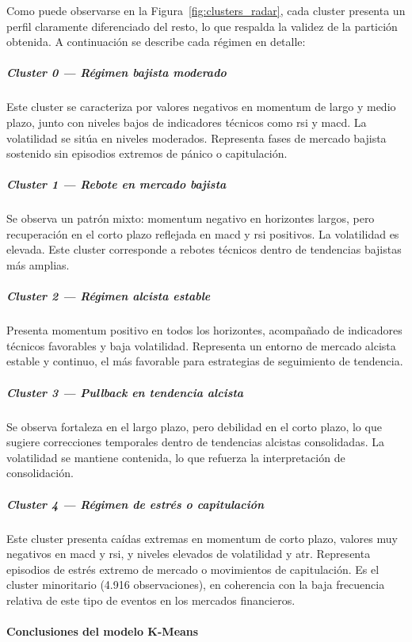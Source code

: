 \documentclass[
]{article}
\begin{document}
Como puede observarse en la Figura~\ref{fig:clusters_radar}, cada 
cluster presenta un perfil claramente diferenciado del resto, lo que 
respalda la validez de la partición obtenida. A continuación se 
describe cada régimen en detalle:

\subparagraph{Cluster 0 — Régimen bajista moderado}

Este cluster se caracteriza por valores negativos en \gls{momentum} 
de largo y medio plazo, junto con niveles bajos de indicadores 
técnicos como \gls{rsi} y \gls{macd}. La volatilidad se sitúa en 
niveles moderados. Representa fases de mercado bajista sostenido sin 
episodios extremos de pánico o capitulación.

\subparagraph{Cluster 1 — Rebote en mercado bajista}

Se observa un patrón mixto: \gls{momentum} negativo en horizontes 
largos, pero recuperación en el corto plazo reflejada en \gls{macd} y 
\gls{rsi} positivos. La volatilidad es elevada. Este cluster 
corresponde a rebotes técnicos dentro de tendencias bajistas más 
amplias.

\subparagraph{Cluster 2 — Régimen alcista estable}

Presenta \gls{momentum} positivo en todos los horizontes, acompañado 
de indicadores técnicos favorables y baja volatilidad. Representa un 
entorno de mercado alcista estable y continuo, el más favorable para 
estrategias de seguimiento de tendencia.

\subparagraph{Cluster 3 — Pullback en tendencia alcista}

Se observa fortaleza en el largo plazo, pero debilidad en el corto 
plazo, lo que sugiere correcciones temporales dentro de tendencias 
alcistas consolidadas. La volatilidad se mantiene contenida, lo que 
refuerza la interpretación de consolidación.

\subparagraph{Cluster 4 — Régimen de estrés o capitulación}

Este cluster presenta caídas extremas en \gls{momentum} de corto 
plazo, valores muy negativos en \gls{macd} y \gls{rsi}, y niveles 
elevados de volatilidad y \gls{atr}. Representa episodios de estrés 
extremo de mercado o movimientos de capitulación. Es el cluster 
minoritario (4.916 observaciones), en coherencia con la baja 
frecuencia relativa de este tipo de eventos en los mercados 
financieros.

\paragraph{Conclusiones del modelo K-Means}
\end{document}
